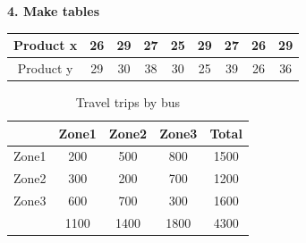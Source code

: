 \documentclass[10pt]{article} %
\begin{document}
\textbf{4. Make tables}
\begin{table}[H]
\centering
\begin{tabular}{|c|c|c|c|c|c|c|c|c|}
\hline Product x & 26 & 29 & 27 & 25 & 29 & 27 & 26 & 29\\
\hline Product y & 29 & 30 & 38 & 30 & 25 & 39 & 26 & 36\\
\hline
\end{tabular}
\end{table}

\begin{table}[h]
\centering
\caption{Travel trips by bus}
\begin{tabular}{c|ccc|c}
 \hline       & Zone1 & Zone2 & Zone3 & Total\\
 \hline Zone1 & 200   & 500   & 800   & 1500\\
        Zone2 & 300   & 200   & 700   & 1200\\
        Zone3 & 600   & 700   & 300   & 1600\\
  \hline      & 1100  & 1400  & 1800  & 4300\\
  \hline
\end{tabular}
\end{table}

\begin{table}[h]
\begin{floatrow}
\end{floatrow}
\end{table}
\end{document}

